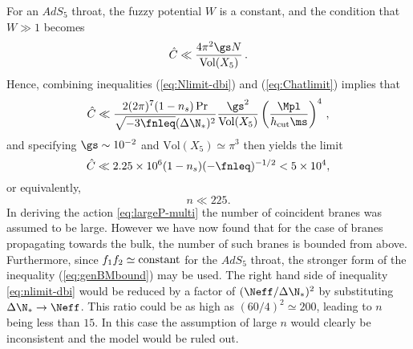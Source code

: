 For an $AdS_5$ throat, the fuzzy potential $W$ is a constant,
and the condition that $W \gg 1$ becomes 
% 
\begin{equation}
\label{eq:Chatlimit}
\hat{C} \ll \frac{4\pi^2\gs N}{\mathrm{Vol}(X_5)} \,.
\end{equation}
% 
Hence, combining inequalities 
(\ref{eq:Nlimit-dbi}) and (\ref{eq:Chatlimit}) implies that
%  
\begin{equation}
\label{eq:nlimit-dbi}
\hat{C} \ll 
\frac{2 (2\pi)^7 (1-n_s)\Pr}{\sqrt{-3\fnleq} ( \Delta \N_*)^2}
\frac{\gs^2}{\mathrm{Vol} (X_5) }
\left( \frac{\Mpl}{h_{\rm cut}\ms} \right)^4  \,,
\end{equation}
% 
and specifying $\gs \sim 10^{-2}$ and 
$\mathrm{Vol}(X_5) \simeq \pi^3$ then yields the limit  
% 
\begin{equation}
\hat{C} \ll 2.25\times 10^{6} (1-n_s)(-\fnleq)^{-1/2} < 5\times 10^4,
\end{equation}
% 
 or equivalently,
%   
\begin{equation}
\label{eq:nbound-multi}
n \ll 225.
\end{equation}
% 
In deriving the action \eqref{eq:largeP-multi} the number of coincident branes was assumed to be
large. However we have now found that for the case of branes propagating towards the bulk, the
number of such branes is bounded from above.
Furthermore, since $f_1f_2 \simeq {\rm constant}$ for the $AdS_5$ throat, 
the stronger form of the inequality (\ref{eq:genBMbound}) may be used. The right hand side of
inequality \eqref{eq:nlimit-dbi} would be reduced by a factor of $(   \Neff /\Delta \N_*)^2$ by
substituting 
$\Delta \N_* \rightarrow \Neff$. This ratio 
could be as high as $(60/4)^2 \simeq 200 $, leading to $n$ being less than $15$. In this case
the assumption of large $n$ would clearly be inconsistent and the model would be ruled out. 